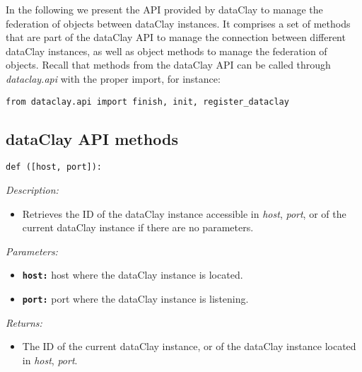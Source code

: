 In the following we present the API provided by dataClay to manage the federation of objects between dataClay instances. It comprises a set of methods that are part of the dataClay API to manage the connection between different dataClay instances, as well as object methods to manage the federation of objects. Recall that methods from the dataClay API can be called through \textit{dataclay.api} with the proper import, for instance:

\colorbox{basecolor!20}{\texttt{from dataclay.api import finish, init, register\_dataclay}}

\subsection{dataClay API methods}
\label{sec:PythonFederationAPI}


\begin{dBox}
\texttt{def ([host, port]):}
\LINE

{\it Description:}

\begin{itemize}
    \item Retrieves the ID of the dataClay instance accessible in \textit{host}, \textit{port}, or of the current dataClay instance if there are no parameters.
\end{itemize}

{\it Parameters:}

\begin{itemize}
  \item \texttt{\bfseries host:} host where the dataClay instance is located.
  \item \texttt{\bfseries port:} port where the dataClay instance is listening.
\end{itemize}

{\it Returns:}

\begin{itemize}
 \item The ID of the current dataClay instance, or of the dataClay instance located in \textit{host}, \textit{port}.
\end{itemize}

\end{dBox}


